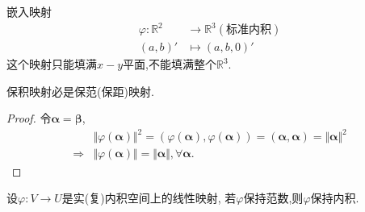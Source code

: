 \begin{example}
  嵌入映射
  \begin{align*}
    \varphi: \mathbb{R}^2 & \longrightarrow \mathbb{R}^3(\text{标准内积})\\
    (a,b)' & \longmapsto (a,b,0)'
  \end{align*}
  这个映射只能填满$x-y$平面,不能填满整个$\mathbb{R}^3$.

\begin{question}
  保积映射必是保范(保距)映射.
\end{question}  
\begin{proof}
  令$\bm{\alpha}=\bm{\beta}$,
  \begin{align*}
    & \Vert\varphi(\bm{\alpha})\Vert^2=(\varphi(\bm{\alpha}),\varphi(\bm{\alpha}))=
      (\bm{\alpha},\bm{\alpha})=\Vert\bm{\alpha}\Vert^2\\
    \Longrightarrow & \Vert\varphi(\bm{\alpha})\Vert=\Vert\bm{\alpha}\Vert, \forall \bm{\alpha}.
  \end{align*}
\end{proof}

\begin{question}
  设$\varphi: V \longrightarrow U$是实(复)内积空间上的线性映射,
  若$\varphi$保持范数,则$\varphi$保持内积.
\end{question}


\end{example}
